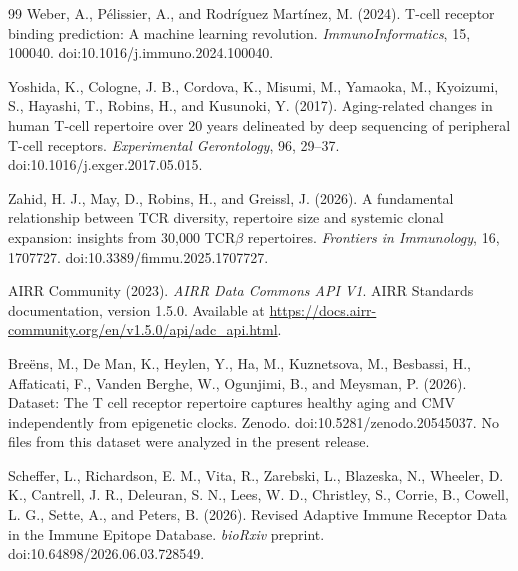 \documentclass[11pt]{article}
\begin{document}
\begin{thebibliography}{99}
Weber, A., P{\'e}lissier, A., and Rodr{\'i}guez Mart{\'i}nez, M. (2024). T-cell receptor binding prediction: A machine learning revolution. \emph{ImmunoInformatics}, 15, 100040. doi:10.1016/j.immuno.2024.100040.

Yoshida, K., Cologne, J. B., Cordova, K., Misumi, M., Yamaoka, M., Kyoizumi, S., Hayashi, T., Robins, H., and Kusunoki, Y. (2017). Aging-related changes in human T-cell repertoire over 20 years delineated by deep sequencing of peripheral T-cell receptors. \emph{Experimental Gerontology}, 96, 29--37. doi:10.1016/j.exger.2017.05.015.

Zahid, H. J., May, D., Robins, H., and Greissl, J. (2026). A fundamental relationship between TCR diversity, repertoire size and systemic clonal expansion: insights from 30,000 TCR$\beta$ repertoires. \emph{Frontiers in Immunology}, 16, 1707727. doi:10.3389/fimmu.2025.1707727.

AIRR Community (2023). \emph{AIRR Data Commons API V1}. AIRR Standards documentation, version 1.5.0. Available at \url{https://docs.airr-community.org/en/v1.5.0/api/adc_api.html}.

Bre\"ens, M., De Man, K., Heylen, Y., Ha, M., Kuznetsova, M., Besbassi, H., Affaticati, F., Vanden Berghe, W., Ogunjimi, B., and Meysman, P. (2026). Dataset: The T cell receptor repertoire captures healthy aging and CMV independently from epigenetic clocks. Zenodo. doi:10.5281/zenodo.20545037. No files from this dataset were analyzed in the present release.

Scheffer, L., Richardson, E. M., Vita, R., Zarebski, L., Blazeska, N., Wheeler, D. K., Cantrell, J. R., Deleuran, S. N., Lees, W. D., Christley, S., Corrie, B., Cowell, L. G., Sette, A., and Peters, B. (2026). Revised Adaptive Immune Receptor Data in the Immune Epitope Database. \emph{bioRxiv} preprint. doi:10.64898/2026.06.03.728549.
\end{thebibliography}
\end{document}
